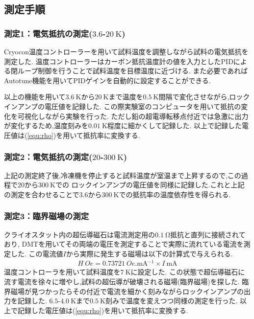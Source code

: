 \subsection{測定手順}
\subsubsection{測定1：電気抵抗の測定($3.6$-$20\ \si{\kelvin}$)}
Cryocon温度コントローラーを用いて試料温度を調整しながら試料の電気抵抗を測定した.
温度コントローラーはカーボン抵抗温度計の値を入力としたPIDによる閉ループ制御を行うことで試料温度を目標温度に近づける.
また必要であればAutotune機能を用いてPIDゲインを自動的に設定することができる.

以上の機能を用いて$3.6\ \si{\kelvin}$から$20\ \si{\kelvin}$まで温度を$0.5\ \si{\kelvin}$間隔で変化させながら,ロックインアンプの電圧値を記録した.
この際実験室のコンピュータを用いて抵抗の変化を可視化しながら実験を行った.
ただし鉛の超電導転移点付近では急激に出力が変化するため,温度刻みを$0.01\ \si{\kelvin}$程度に細かくして記録した.
以上で記録した電圧値は(\ref{equ:rho})を用いて抵抗率に変換する.
\subsubsection{測定2：電気抵抗の測定($20$-$300\ \si{\kelvin}$)}
上記の測定終了後,冷凍機を停止すると試料温度が室温まで上昇するので,この過程で$20$から$300\ \si{\kelvin}$での
ロックインアンプの電圧値を同様に記録した.これと上記の測定を合わせることで$3.6$から$300\ \si{\kelvin}$での抵抗率の温度依存性を得られる.
\subsubsection{測定3：臨界磁場の測定}
クライオスタット内の超伝導磁石は電流測定用の$0.1\ \si{\ohm}$抵抗と直列に接続されており,
DMTを用いてその両端の電圧を測定することで実際に流れている電流を測定した.
この電流値$I$から実際に発生する磁場は以下の計算式で与えられる.
\begin{align}
  H\ \si{Oe}=0.73721\ \si{Oe.\milli\ampere^{-1}}\times I\ \si{\milli\ampere}
\end{align}
温度コントローラを用いて試料温度を$7\ \si{\kelvin}$に設定した.
この状態で超伝導磁石に流す電流を徐々に増やし,試料の超伝導が破壊される磁場(臨界磁場)を探した.
臨界磁場が見つかったらその付近で電流を細かく刻みながらロックインアンプの出力を記録した.
$6.5$-$4.0\ \si{\kelvin}$まで$0.5\ \si{\kelvin}$刻みで温度を変えつつ同様の測定を行った.
以上で記録した電圧値は(\ref{equ:rho})を用いて抵抗率に変換する.